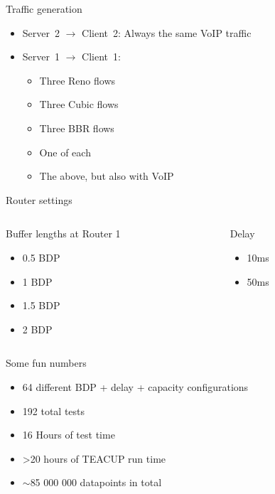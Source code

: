 \documentclass[presentation]{beamer}
\begin{document}
\begin{frame}[label={sec:org8cbd992}]{Traffic generation}


\begin{itemize}[<+->]
\item Server~2 \(\to\) Client~2: Always the same VoIP traffic
\item Server~1 \(\to\) Client~1:
\begin{itemize}
\item Three Reno flows
\item Three Cubic flows
\item Three BBR flows
\item One of each
\item The above, but also with VoIP
\end{itemize}
\end{itemize}
\end{frame}
\begin{frame}[label={sec:orgcb51d7c}]{Router settings}

\begin{columns}
\begin{column}{.5\columnwidth}
\begin{block}{Buffer lengths at Router 1}
\begin{itemize}
\item 0.5 BDP
\item 1 BDP
\item 1.5 BDP
\item 2 BDP
\end{itemize}
\end{block}
\end{column}
\begin{column}{.5\columnwidth}
\begin{block}{Delay}
\begin{itemize}
\item 10ms
\item 50ms
\end{itemize}
\end{block}
\end{column}
\end{columns}
\end{frame}
\begin{frame}[label={sec:org58fe05d}]{Some fun numbers}


\begin{itemize}[<+->]
\item 64 different BDP + delay + capacity configurations
\item 192 total tests
\item 16 Hours of test time
\item >20 hours of TEACUP run time
\item \(\sim\)85 000 000 datapoints in total
\end{itemize}
\end{frame}
\end{document}
